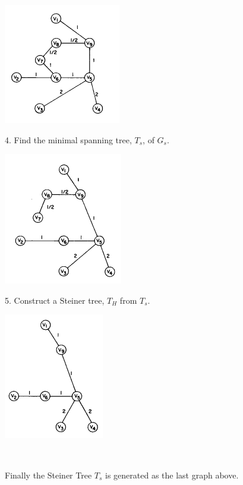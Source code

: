 \documentclass[letterpaper,11pt,twocolumn]{article}
\begin{document}
\begin{center}
    \includegraphics[scale = 0.8]{d.png}
\end{center}
4. Find the minimal spanning tree, $T_s$, of $G_s$.
\begin{center}
    \includegraphics[scale = 0.8]{e.png}
\end{center}
5. Construct a Steiner tree, $T_H$ from $T_s$.
\begin{center}
    \includegraphics[scale = 0.8]{f.png}
\end{center}\\
\begin{flushleft}
Finally the Steiner Tree $T_s$ is generated as the last graph above.\\
\end{flushleft}
\end{document}
